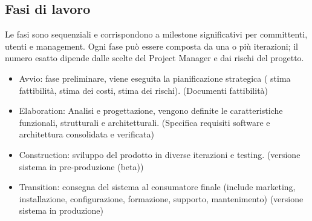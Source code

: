 \documentclass[a4paper,12pt]{report}
\begin{document}
	\subsection{Fasi di lavoro}
	Le fasi sono sequenziali e corrispondono a milestone significativi per committenti, utenti e management. Ogni fase può essere composta da una o più iterazioni; il numero esatto dipende dalle scelte del Project Manager e dai rischi del progetto.
	\begin{itemize}
		\item Avvio: fase preliminare, viene eseguita la pianificazione strategica ( stima fattibilità, stima dei costi, stima dei rischi). (Documenti fattibilità)
		\item Elaboration: Analisi e progettazione, vengono definite le caratteristiche funzionali, strutturali e architetturali. (Specifica requisiti software e architettura consolidata e verificata)
		\item Construction: sviluppo del prodotto in diverse iterazioni e testing. (versione sistema in pre-produzione (beta))
		\item Transition: consegna del sistema al consumatore finale (include marketing, installazione, configurazione, formazione, supporto, mantenimento) (versione sistema in produzione)
	\end{itemize}
\end{document}
